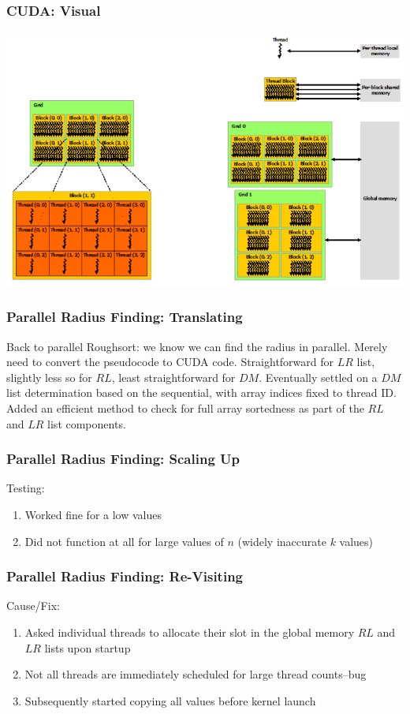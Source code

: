 \documentclass[10pt, xcolor={dvipsnames}, aspectratio=169]{beamer}
\begin{document}
\begin{frame}
	\frametitle{CUDA: Visual}
	\includegraphics[height=.9\textheight]{./cudaorg.png}
\end{frame}

\begin{frame}
\frametitle{Parallel Radius Finding: Translating}
Back to parallel Roughsort: we know we can find the radius in parallel.  Merely need to convert the pseudocode to CUDA code.
\newline\newline
Straightforward for $LR$ list, slightly less so for $RL$, least straightforward for $DM$.
\newline\newline
Eventually settled on a $DM$ list determination based on the sequential, with array indices fixed to thread ID.
\newline\newline
Added an efficient method to check for full array sortedness as part of the $RL$ and $LR$ list components.
\end{frame}


\begin{frame}
	\frametitle{Parallel Radius Finding: Scaling Up}
Testing:
\begin{enumerate}
	\item Worked fine for a low values
	\item Did not function at all for large values of $n$ (widely inaccurate $k$ values)
\end{enumerate}
\end{frame}

\begin{frame}
	\frametitle{Parallel Radius Finding: Re-Visiting}
	Cause/Fix:
	\begin{enumerate}
		\item Asked individual threads to allocate their slot in the global memory $RL$ and $LR$ lists upon startup
		\item Not all threads are immediately scheduled for large thread counts--bug
		\item Subsequently started copying all values before kernel launch
	\end{enumerate}
	
\end{frame}
\end{document}
